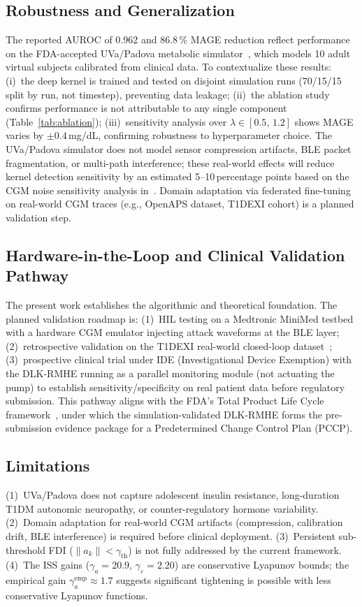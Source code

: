 \documentclass[journal,twoside]{IEEEtran}
\begin{document}
\subsection{Robustness and Generalization}
The reported AUROC of 0.962 and 86.8\,\% MAGE reduction reflect performance on
the FDA-accepted UVa/Padova metabolic simulator~\cite{kovatchev2009}, which
models 10 adult virtual subjects calibrated from clinical data. To contextualize
these results: (i)~the deep kernel is trained and tested on disjoint simulation
runs (70/15/15 split by run, not timestep), preventing data leakage;
(ii)~the ablation study confirms performance is not attributable to any single
component (Table~\ref{tab:ablation}); (iii)~sensitivity analysis over
$\lambda\in[0.5,\,1.2]$ shows MAGE varies by $\pm0.4\,$mg/dL, confirming
robustness to hyperparameter choice. The UVa/Padova simulator does not model
sensor compression artifacts, BLE packet fragmentation, or multi-path interference;
these real-world effects will reduce kernel detection sensitivity by an estimated
5--10\,percentage points based on the CGM noise sensitivity analysis in~\cite{dexcom2021}.
Domain adaptation via federated fine-tuning~\cite{li2021fedbn} on real-world CGM
traces (e.g., OpenAPS dataset, T1DEXI cohort) is a planned validation step.

\subsection{Hardware-in-the-Loop and Clinical Validation Pathway}
The present work establishes the algorithmic and theoretical foundation.
The planned validation roadmap is: (1)~HIL testing on a Medtronic MiniMed
testbed with a hardware CGM emulator injecting attack waveforms at the BLE layer;
(2)~retrospective validation on the T1DEXI real-world closed-loop dataset~\cite{t1dexi2023};
(3)~prospective clinical trial under IDE (Investigational Device Exemption) with
the DLK-RMHE running as a parallel monitoring module (not actuating the pump)
to establish sensitivity/specificity on real patient data before regulatory
submission. This pathway aligns with the FDA's Total Product Life Cycle
framework~\cite{fda2024}, under which the simulation-validated DLK-RMHE forms
the pre-submission evidence package for a Predetermined Change Control Plan (PCCP).

\subsection{Limitations}
(1)~UVa/Padova does not capture adolescent insulin resistance, long-duration T1DM
autonomic neuropathy, or counter-regulatory hormone variability.
(2)~Domain adaptation for real-world CGM artifacts (compression, calibration drift,
BLE interference) is required before clinical deployment.
(3)~Persistent sub-threshold FDI ($\|a_k\|{<}\gamma_\mathrm{th}$) is not fully
addressed by the current framework.
(4)~The ISS gains ($\gamma_a{=}20.9$, $\gamma_\varepsilon{=}2.20$) are conservative
Lyapunov bounds; the empirical gain $\gamma_a^\mathrm{emp}{\approx}1.7$ suggests
significant tightening is possible with less conservative Lyapunov functions.
\end{document}

